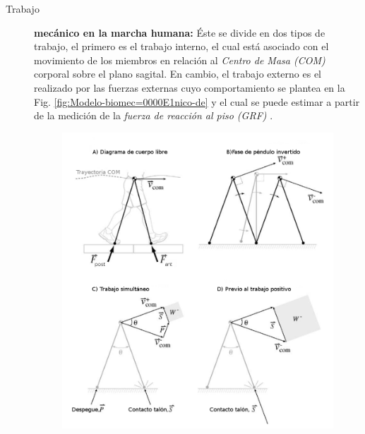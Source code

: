 \documentclass[12pt,english]{article}
\begin{document}
\begin{description}
\item [{Trabajo}] \textbf{mecánico en la marcha humana: }Éste se divide
en dos tipos de trabajo, el primero es el trabajo interno, el cual
está asociado con el movimiento de los miembros en relación al \emph{Centro
de Masa (COM) }corporal
sobre el plano sagital. En cambio, el trabajo externo es el realizado
por las fuerzas externas cuyo comportamiento se plantea en la Fig.
\ref{fig:Modelo-biomec=0000E1nico-de} y el cual se puede estimar
a partir de la medición de la \emph{fuerza de reacción al piso (GRF)}
.


\begin{figure}
\begin{centering}
\includegraphics[scale=0.45]{workLL}
\par\end{centering}


\end{figure}
\end{description}
\end{document}
